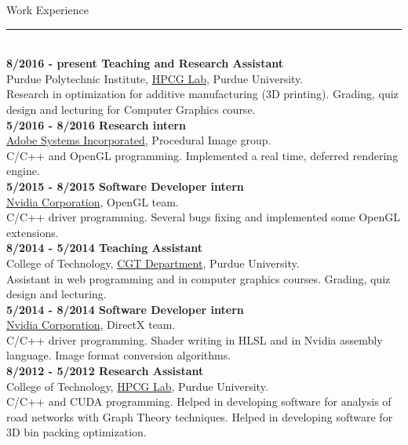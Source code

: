 \documentclass[letterpaper,10pt]{article}
\begin{document}
\begin{minipage}{0.5\textwidth}
\vspace*{0.25cm}
 {\large{Work Experience}} \\
 \textcolor{Dandelion}{\rule{0.5\textwidth}{0.05in}} \\
\textbf{8/2016 - present Teaching and Research Assistant} \\
Purdue Polytechnic Institute, \href{http://hpcg.purdue.edu/}{HPCG Lab}, Purdue University. \\
Research in optimization for additive manufacturing (3D printing). Grading, quiz design and lecturing for Computer Graphics course.\\

\textbf{5/2016 - 8/2016 Research intern} \\
\href{http://www.adobe.com/}{Adobe Systems Incorporated}, Procedural Image group. \\
C/C++ and OpenGL programming. Implemented a real time, deferred rendering engine.\\

\textbf{5/2015 - 8/2015 Software Developer intern} \\
\href{http://www.nvidia.com/}{Nvidia Corporation}, OpenGL team. \\
C/C++ driver programming. Several bugs fixing and implemented some OpenGL extensions.\\

\textbf{8/2014 - 5/2014 Teaching Assistant} \\
College of Technology, \href{http://tech.purdue.edu/degrees/computer-graphics-technology}{CGT Department}, Purdue University. \\
Assistant in web programming and in computer graphics courses. Grading, quiz design and lecturing.\\

\textbf{5/2014 - 8/2014 Software Developer intern} \\
\href{http://www.nvidia.com/}{Nvidia Corporation}, DirectX team. \\
C/C++ driver programming. Shader writing in HLSL and in Nvidia assembly language. Image format conversion algorithms.\\

\textbf{8/2012 - 5/2012 Research Assistant} \\
College of Technology, \href{http://hpcg.purdue.edu/}{HPCG Lab}, Purdue University. \\
C/C++ and CUDA programming. Helped in developing software for analysis of road networks with Graph Theory techniques. Helped in developing software for 3D bin packing optimization.\\


\end{minipage}
\end{document}
